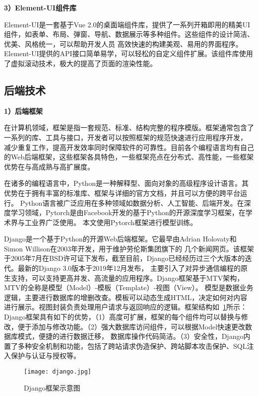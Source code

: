 \textbf{3）Element-UI组件库}

Element-UI是一套基于Vue 2.0的桌面端组件库，提供了一系列开箱即用的精美UI组件，如表单、布局、弹窗、导航、数据展示等多种组件。这些组件的设计简洁、优美、风格统一，可以帮助开发人员 
高效快速的构建美观、易用的界面程序。Element-UI提供的API接口简单易学，可以轻松的自定义组件扩展。该组件库使用了虚拟滚动技术，极大的提高了页面的渲染性能。

\subsection{后端技术}

\textbf{1）后端框架}

在计算机领域，框架是指一套规范、标准、结构完整的程序模版。框架通常包含了一系列的库、工具与接口，开发者可以按照框架的规范快速进行应用程序开发，
减少重复工作，提高开发效率同时保障软件的可靠性。目前各个编程语言均有自己的Web后端框架，这些框架各具特色，一些框架亮点在分布式、高性能，一些框架优势在与高成熟与高扩展度。

在诸多的编程语言中，Python是一种解释型、面向对象的高级程序设计语言。其优势在于拥有丰富的标准库、框架与详细的官方文档，并且可以方便的跨平台运行。
Python语言被广泛应用在多种领域如数据分析、人工智能、后端开发。在深度学习领域，Pytorch是由Facebook开发的基于Python的开源深度学习框架，在学术界与工业界广泛使用。
本文使用Pytorch框架进行模型训练。

Django是一个基于Python的开源Web后端框架。它最早由Adrian Holovaty和Simon Willison在2003年开发，用于维护劳伦斯集团旗下的
几个新闻网页。该框架于2005年7月在BSD许可证下发布，截至目前，Django已经经历过三个大版本的迭代。最新的Django 3.0版本于2019年12月发布，
主要引入了对异步通信编程的原生支持，可以支持更高并发、高流量的应用程序。Django框架基于MTV架构，MTV的全称是模型（Model）-模板（Template）-视图（View）。
模型是数据业务逻辑，主要进行数据库的增删改查。模板可以动态生成HTML，决定如何对内容进行展示。视图封装负责处理用户请求与返回响应的逻辑。框架结构如~\ref{fig:django}所示：
Django框架具有如下的优势，（1）高度可扩展，框架的每个组件均可以替换与修改，便于添加与修改功能。（2）强大数据库访问组件，可以根据Model快速更改数据库模式，便捷的进行数据迁移，
数据库操作代码简洁。（3）安全性，Django内置了多种安全机制和功能，包括了跨站请求伪造保护、跨站脚本攻击保护、SQL注入保护与认证与授权等。

\begin{figure}
  \centering
  \texttt{[image: django.jpg]}
  \caption{Django框架示意图}
  \label{fig:django}
\end{figure}



